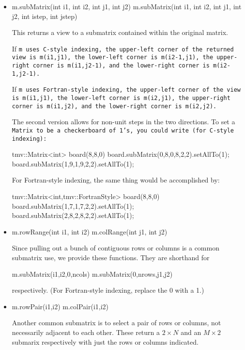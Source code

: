 \begin{itemize}
\item
\begin{tmvcode}
m.subMatrix(int i1, int i2, int j1, int j2)
m.subMatrix(int i1, int i2, int j1, int j2, int istep, int jstep)
\end{tmvcode}
This returns a view to a submatrix contained within the original matrix.

If \tt{m} uses C-style indexing, 
the upper-left corner of the returned view is \tt{m(i1,j1)},
the lower-left corner is \tt{m(i2-1,j1)},
the upper-right corner is \tt{m(i1,j2-1)}, and
the lower-right corner is \tt{m(i2-1,j2-1)}.

If \tt{m} uses Fortran-style indexing, 
the upper-left corner of the view is \tt{m(i1,j1)},
the lower-left corner is \tt{m(i2,j1)},
the upper-right corner is \tt{m(i1,j2)}, and
the lower-right corner is \tt{m(i2,j2)}.

The second version allows for non-unit steps in the two directions.
To set a \tt{Matrix} to be a checkerboard of 1's, you could write 
(for C-style indexing):
\begin{tmvcode}
tmv::Matrix<int> board(8,8,0)
board.subMatrix(0,8,0,8,2,2).setAllTo(1);
board.subMatrix(1,9,1,9,2,2).setAllTo(1);
\end{tmvcode}

For Fortran-style indexing, the same thing would be accomplished by:
\begin{tmvcode}
tmv::Matrix<int,tmv::FortranStyle> board(8,8,0)
board.subMatrix(1,7,1,7,2,2).setAllTo(1);
board.subMatrix(2,8,2,8,2,2).setAllTo(1);
\end{tmvcode}

\item
\begin{tmvcode}
m.rowRange(int i1, int i2)
m.colRange(int j1, int j2)
\end{tmvcode}
Since pulling out a bunch of contiguous rows or columns is a common 
submatrix use, we provide these functions.  They are shorthand for
\begin{tmvcode}
m.subMatrix(i1,i2,0,ncols)
m.subMatrix(0,nrows,j1,j2)
\end{tmvcode}
respectively.  (For Fortran-style indexing, replace the 0 with a 1.)

\item
\begin{tmvcode}
m.rowPair(i1,i2)
m.colPair(i1,i2)
\end{tmvcode}
Another common submatrix is to select a pair of rows or columns, not 
necessarily adjacent to each other.  These return a $2\times N$ and an $M\times 2$
submarix respectively with just the rows or columns indicated.


\end{itemize}

